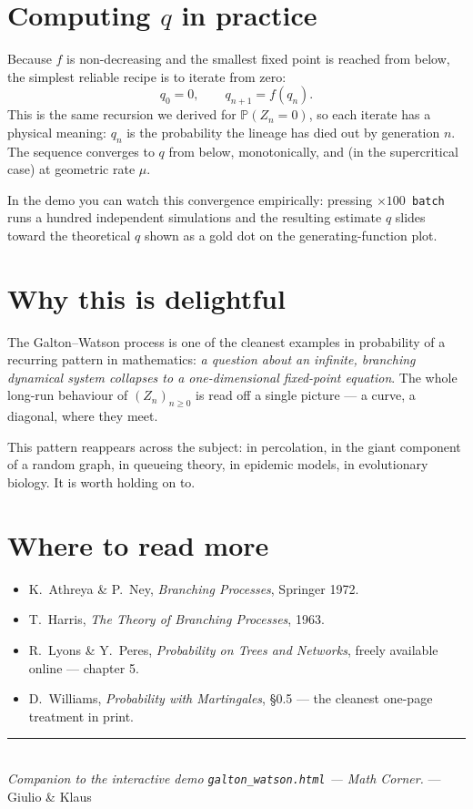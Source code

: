 \documentclass[11pt]{article}
\begin{document}
\section{Computing \texorpdfstring{$q$}{q} in practice}
Because $f$ is non-decreasing and the smallest fixed point is reached from below, the simplest reliable recipe is to iterate from zero:
\[
q_0 = 0, \qquad q_{n+1} = f(q_n).
\]
This is the same recursion we derived for $\mathbb{P}(Z_n = 0)$, so each iterate has a physical meaning: $q_n$ is the probability the lineage has died out by generation $n$. The sequence converges to $q$ from below, monotonically, and (in the supercritical case) at geometric rate $\mu$.

In the demo you can watch this convergence empirically: pressing \texttt{$\times 100$ batch} runs a hundred independent simulations and the resulting estimate $\hat q$ slides toward the theoretical $q$ shown as a gold dot on the generating-function plot.

\section{Why this is delightful}
The Galton--Watson process is one of the cleanest examples in probability of a recurring pattern in mathematics: \emph{a question about an infinite, branching dynamical system collapses to a one-dimensional fixed-point equation}. The whole long-run behaviour of $(Z_n)_{n \geq 0}$ is read off a single picture --- a curve, a diagonal, where they meet.

This pattern reappears across the subject: in percolation, in the giant component of a random graph, in queueing theory, in epidemic models, in evolutionary biology. It is worth holding on to.

\section*{Where to read more}
\begin{itemize}[leftmargin=*, itemsep=2pt]
  \item K.~Athreya \& P.~Ney, \emph{Branching Processes}, Springer 1972.
  \item T.~Harris, \emph{The Theory of Branching Processes}, 1963.
  \item R.~Lyons \& Y.~Peres, \emph{Probability on Trees and Networks}, freely available online --- chapter 5.
  \item D.~Williams, \emph{Probability with Martingales}, \S 0.5 --- the cleanest one-page treatment in print.
\end{itemize}

\vfill
\noindent\rule{\textwidth}{0.3pt}\\
\textit{Companion to the interactive demo \texttt{galton\_watson.html} --- Math Corner.}
\hfill --- Giulio \& Klaus
\end{document}
